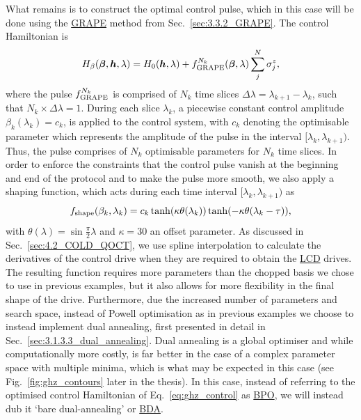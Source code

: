 \documentclass[a4paper,oneside,11pt]{book}
\newcommand{\betabb}{\boldsymbol{\beta}}
\newcommand{\hbb}{\boldsymbol{h}}
\newcommand{\sz}{\sigma^z}
\newcommand{\acrref}[1]{\hyperref[acr:#1]{#1}}
\begin{document}
What remains is to construct the optimal control pulse, which in this case will be done using the \acrref{GRAPE} method from Sec.~\ref{sec:3.3.2_GRAPE}. The control Hamiltonian is
\begin{equation}\label{eq:ghz_control}
    H_{\beta}(\betabb, \hbb, \lambda) = H_0(\hbb, \lambda) + f^{N_k}_{\rm GRAPE}(\betabb, \lambda) \sum_j^N \sz_j,
\end{equation}
where the pulse $f^{N_k}_{\rm GRAPE}$ is comprised of $N_k$ time slices $\Delta \lambda = \lambda_{k+1} - \lambda_k$, such that $N_k \times \Delta \lambda = 1$. During each slice $\lambda_k$, a piecewise constant control amplitude $\beta_k(\lambda_k) = c_k$, is applied to the control system, with $c_k$ denoting the optimisable parameter which represents the amplitude of the pulse in the interval $[\lambda_k, \lambda_{k+1})$. Thus, the pulse comprises of $N_k$ optimisable parameters for $N_k$ time slices. In order to enforce the constraints that the control pulse vanish at the beginning and end of the protocol and to make the pulse more smooth, we also apply a shaping function, which acts during each time interval $[\lambda_k, \lambda_{k+1})$ as
\begin{equation}
        f_{\rm shape}(\beta_k, \lambda_k) = c_k \tanh (\kappa \theta(\lambda_k)) \tanh (- \kappa \theta(\lambda_k - \tau)),
\end{equation}
with $\theta(\lambda) = \sin \frac{\pi}{2} \lambda$ and $\kappa = 30$ an offset parameter. As discussed in Sec.~\ref{sec:4.2_COLD_QOCT}, we use spline interpolation to calculate the derivatives of the control drive when they are required to obtain the \acrref{LCD} drives. The resulting function requires more parameters than the chopped basis we chose to use in previous examples, but it also allows for more flexibility in the final shape of the drive. Furthermore, due the increased number of parameters and search space, instead of Powell optimisation as in previous examples we choose to instead implement dual annealing, first presented in detail in Sec.~\ref{sec:3.1.3.3_dual_annealing}. Dual annealing is a global optimiser and while computationally more costly, is far better in the case of a complex parameter space with multiple minima, which is what may be expected in this case (see Fig.~\ref{fig:ghz_contours} later in the thesis). In this case, instead of referring to the optimised control Hamiltonian of Eq.~\eqref{eq:ghz_control} as \acrref{BPO}, we will instead dub it `bare dual-annealing' or \acrref{BDA}. 
\end{document}
